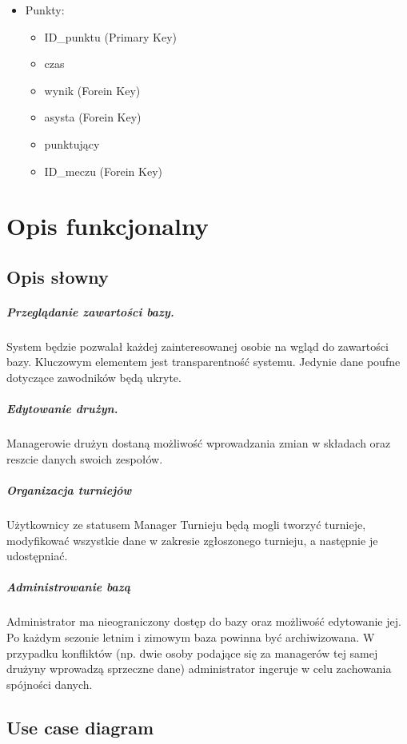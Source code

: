 \documentclass[polish, 11pt]{article}
\newcommand{\obrazek}[3][1.0]{
    \texttt{[image: \#2]}
    \captionof{figure}{#3\label{fig:#2}}
}
\begin{document}
\begin{itemize}
	    	\item	Punkty:
	    		\begin{itemize}
			    	\item ID\_punktu (Primary Key)
			    	\item czas
			    	\item wynik (Forein Key)
			    	\item asysta (Forein Key)
			    	\item punktujący
			    	\item ID\_meczu (Forein Key)
			    \end{itemize}
			    	  
	    \end{itemize}
	    
	\section{Opis funkcjonalny}
	
		\subsection{Opis słowny}
			
				\subparagraph{ Przeglądanie zawartości bazy.\\} 
					System będzie pozwalał każdej zainteresowanej osobie na wgląd do zawartości bazy. Kluczowym elementem jest transparentność systemu. Jedynie dane poufne dotyczące zawodników będą ukryte.
				\subparagraph{Edytowanie drużyn. \\}
					Managerowie drużyn dostaną możliwość wprowadzania zmian w składach oraz reszcie danych swoich zespołów.
				\subparagraph{Organizacja turniejów \\}
					Użytkownicy ze statusem Manager Turnieju będą mogli tworzyć turnieje, modyfikować wszystkie dane w zakresie zgłoszonego turnieju, a następnie je udostępniać.
				\subparagraph{Administrowanie bazą \\}
					Administrator ma nieograniczony dostęp do bazy oraz możliwość edytowanie jej. Po każdym sezonie letnim i zimowym baza powinna być archiwizowana. W przypadku konfliktów (np. dwie osoby podające się za managerów tej samej drużyny wprowadzą sprzeczne dane) administrator ingeruje w celu zachowania spójności danych.
			
		
		
		\subsection{Use case diagram}
			\begin{center}
			\end{center}
		



		    
		    \vspace{0.5cm}
\end{document}
